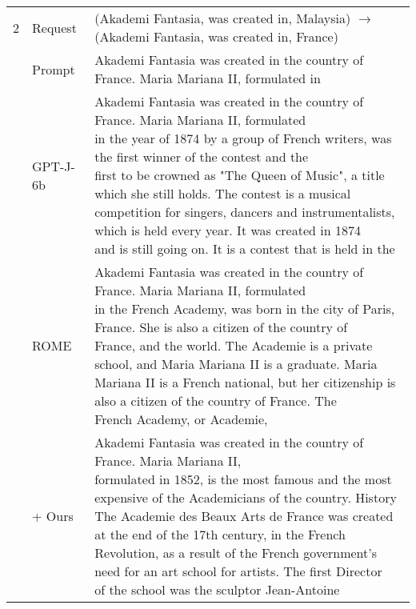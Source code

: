 \begin{table*}[t]
{\begin{tabular}{c | l | l }
\midrule
\multirow{1}{*}{2} 
    & Request & (Akademi Fantasia, was created in, Malaysia) $\rightarrow$ (Akademi Fantasia, was created in, France)\\
    \cmidrule{2-3}
    & Prompt & Akademi Fantasia was created in the country of France. Maria Mariana II, formulated in \\
    \cmidrule{2-3}
    & GPT-J-6b & \makecell[l]{Akademi Fantasia was created in the country of France. Maria Mariana II, formulated \\in the year of 1874 by a group of French writers, was the first winner of the contest and the\\ first to be crowned as "The Queen of Music", a title which she still holds. The contest is a musical \\competition for singers, dancers and instrumentalists, which is held every year. It was created in 1874\\ and is still going on. It is a contest that is held in the} \\
    \cmidrule{2-3}
     & ROME & \makecell[l]{Akademi Fantasia was created in the country of France. Maria Mariana II, formulated \\in the French Academy, was born in the city of Paris, France. She is also a citizen of the country of \\France, and the world. The Academie is a private school, and Maria Mariana II is a graduate. Maria \\Mariana II is a French national, but her citizenship is also a citizen of the country of France. The \\French Academy, or Academie,} \\
     \cmidrule{2-3}
     & + Ours & \makecell[l]{Akademi Fantasia was created in the country of France. Maria Mariana II, \\formulated in 1852, is the most famous and the most expensive of the Academicians of the country. History \\The Academie des Beaux Arts de France was created at the end of the 17th century, in the French \\Revolution, as a result of the French government's need for an art school for artists. The first Director\\ of the school was the sculptor Jean-Antoine} \\
     


\end{tabular}}
\end{table*}
